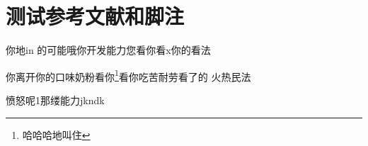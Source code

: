 \chapter{测试参考文献和脚注}
    你地in 的可能哦你开发能力您\cite{Bernard}看你看x你的看法

    你离开你的口味奶粉看你\footnote{哈哈哈地叫住}看你吃苦耐劳看了的\cite{indjkf}
    火热民法\cite{Bernard03}

    愤怒呢1那缕能力jkndk 
\label{chap:mkm}
